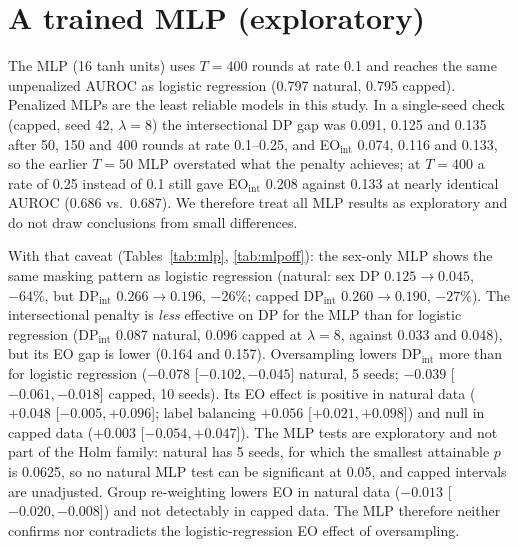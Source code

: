 
\section{A trained MLP (exploratory)}
\label{sec:mlp}
The MLP (16 tanh units) uses $T{=}400$ rounds at rate 0.1 and reaches the same unpenalized AUROC as logistic regression (0.797 natural, 0.795 capped). Penalized MLPs are the least reliable models in this study. In a single-seed check (capped, seed 42, $\lambda{=}8$) the intersectional DP gap was 0.091, 0.125 and 0.135 after 50, 150 and 400 rounds at rate 0.1--0.25, and EO$_\text{int}$ 0.074, 0.116 and 0.133, so the earlier $T{=}50$ MLP overstated what the penalty achieves; at $T{=}400$ a rate of 0.25 instead of 0.1 still gave EO$_\text{int}$ 0.208 against 0.133 at nearly identical AUROC (0.686 vs.\ 0.687). We therefore treat all MLP results as exploratory and do not draw conclusions from small differences.

With that caveat (Tables~\ref{tab:mlp}, \ref{tab:mlpoff}): the sex-only MLP shows the same masking pattern as logistic regression (natural: sex DP $0.125\to0.045$, $-64\%$, but DP$_\text{int}$ $0.266\to0.196$, $-26\%$; capped DP$_\text{int}$ $0.260\to0.190$, $-27\%$). The intersectional penalty is \emph{less} effective on DP for the MLP than for logistic regression (DP$_\text{int}$ 0.087 natural, 0.096 capped at $\lambda{=}8$, against 0.033 and 0.048), but its EO gap is lower (0.164 and 0.157). Oversampling lowers DP$_\text{int}$ more than for logistic regression ($-0.078$ [$-0.102,-0.045$] natural, 5 seeds; $-0.039$ [$-0.061,-0.018$] capped, 10 seeds). Its EO effect is positive in natural data ($+0.048$ [$-0.005,+0.096$]; label balancing $+0.056$ [$+0.021,+0.098$]) and null in capped data ($+0.003$ [$-0.054,+0.047$]). The MLP tests are exploratory and not part of the Holm family: natural has 5 seeds, for which the smallest attainable $p$ is 0.0625, so no natural MLP test can be significant at 0.05, and capped intervals are unadjusted. Group re-weighting lowers EO in natural data ($-0.013$ [$-0.020,-0.008$]) and not detectably in capped data. The MLP therefore neither confirms nor contradicts the logistic-regression EO effect of oversampling.

\begin{table}[t]
\centering
\caption{MLP (16 tanh units, $T{=}400$, rate 0.1) at $\lambda{=}8$; mean over seeds (5 natural, 10 capped). Exploratory.}
\label{tab:mlp}
\small
\setlength{\tabcolsep}{4pt}
\end{table}

